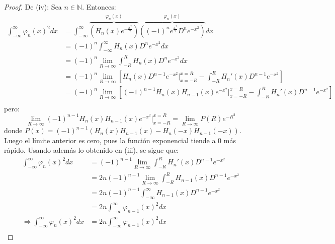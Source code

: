 \documentclass[12pt]{report}
\newcounter{it}
\theoremstyle{largebreak}
\begin{document}
\begin{proof}
        De (iv): Sea $n\in\mathbb{N}$. Entonces:
        \begin{equation*}
            \begin{split}
                \int_{ -\infty}^\infty\varphi_n(x)^2dx&=\int_{ -\infty}^\infty \overbrace{\left(H_n(x)e^{-\frac{x^2}{2}}\right)}^{\varphi_n(x)} \overbrace{\left((-1)^ne^{\frac{x^2}{2}}D^ne^{-x^2} \right)}^{\varphi_n(x)} dx\\
                &=(-1)^n\int_{ -\infty}^\infty H_n(x)D^ne^{-x^2}dx\\
                &=(-1)^n\lim_{R\rightarrow\infty}\int_{ -R}^R H_n(x)D^ne^{-x^2}dx\\
                &=(-1)^n\lim_{R\rightarrow\infty}\left[H_n(x)D^{n-1} e^{-x^2}\Big|_{x=-R}^{x=R}-\int_{-R}^R H_n'(x)D^{n-1}e^{-x^2} \right]\\
                &=(-1)^n\lim_{R\rightarrow\infty}\left[(-1)^{n-1}H_n(x)H_{ n-1}(x)e^{-x^2} \Big|_{x=-R}^{x=R}-\int_{-R}^R H_n'(x)D^{n-1}e^{-x^2} \right]\\
            \end{split}
        \end{equation*}
        pero:
        \begin{equation*}
            \lim_{R\rightarrow\infty}(-1)^{n-1}H_n(x)H_{ n-1}(x)e^{-x^2} \Big|_{x=-R}^{x=R}=\lim_{R\rightarrow\infty} P(R)e^{-R^2}
        \end{equation*}
        donde $P(x)=(-1)^{n-1}\left(H_n(x)H_{ n-1}(x)-H_n(-x)H_{ n-1}(-x)\right)$. Luego el límite anterior es cero, pues la función exponencial tiende a 0 más rápido. Usando además lo obtenido en (iii), se sigue que:
        \begin{equation*}
            \begin{split}
                \int_{ -\infty}^\infty\varphi_n(x)^2dx&=(-1)^{n-1}\lim_{R\rightarrow\infty}\int_{-R}^R H_n'(x)D^{n-1}e^{-x^2}\\
                &=2n(-1)^{n-1}\lim_{R\rightarrow\infty}\int_{-R}^R H_{ n-1}(x)D^{n-1}e^{-x^2}\\
                &=2n(-1)^{n-1}\int_{-\infty}^\infty H_{ n-1}(x)D^{n-1}e^{-x^2}\\
                &=2n\int_{ -\infty}^\infty\varphi_{ n-1}(x)^2dx\\
                \Rightarrow \int_{ -\infty}^\infty\varphi_n(x)^2dx&=2n\int_{ -\infty}^\infty\varphi_{ n-1}(x)^2dx\\
            \end{split}
        \end{equation*}

\end{proof}
\end{document}
